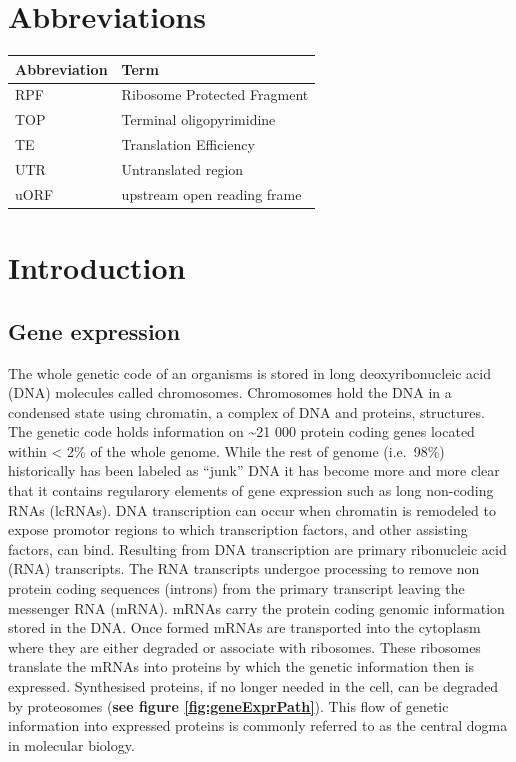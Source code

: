 \documentclass[12pt,openany]{book}
\author{}
\date{\vspace{-2.5em}}
\begin{document}
{
\setcounter{tocdepth}{3}
\tableofcontents
}
\cleardoublepage
\pagestyle{fancy} \fancyhf{} \renewcommand{\headrulewidth}{0pt}
\fancyfoot[LE,RO]{\thepage} \renewcommand{\floatpagefraction}{.9}
\setcounter{page}{9}

\chapter*{Abbreviations}\label{abbreviations}

\begin{tabular}{ll}
\toprule
Abbreviation & Term\\
\midrule
RPF & Ribosome Protected Fragment\\
TOP & Terminal oligopyrimidine\\
TE & Translation Efficiency\\
UTR & Untranslated region\\
uORF & upstream open reading frame\\
\bottomrule
\end{tabular}

\chapter{Introduction}

\section{Gene expression}

The whole genetic code of an organisms is stored in long
deoxyribonucleic acid (DNA) molecules called chromosomes. Chromosomes
hold the DNA in a condensed state using chromatin, a complex of DNA and
proteins, structures. The genetic code holds information on
\textasciitilde{}21 000 protein coding genes located within \textless{}
2\% of the whole genome. While the rest of genome (i.e.~98\%)
historically has been labeled as ``junk'' DNA it has become more and
more clear that it contains regularory elements of gene expression such
as long non-coding RNAs (lcRNAs). DNA transcription can occur when
chromatin is remodeled to expose promotor regions to which transcription
factors, and other assisting factors, can bind. Resulting from DNA
transcription are primary ribonucleic acid (RNA) transcripts. The RNA
transcripts undergoe processing to remove non protein coding sequences
(introns) from the primary transcript leaving the messenger RNA (mRNA).
mRNAs carry the protein coding genomic information stored in the DNA.
Once formed mRNAs are transported into the cytoplasm where they are
either degraded or associate with ribosomes. These ribosomes translate
the mRNAs into proteins by which the genetic information then is
expressed. Synthesised proteins, if no longer needed in the cell, can be
degraded by proteosomes (\textbf{see figure \ref{fig:geneExprPath}}).
This flow of genetic information into expressed proteins is commonly
referred to as the central dogma in molecular biology.
\end{document}
